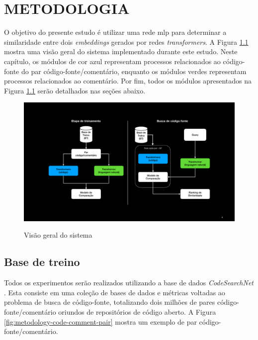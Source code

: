 \chapter{METODOLOGIA}
\label{chp:methodology}
\graphicspath{ {./imagens/metodologia} }

O objetivo do presente estudo é utilizar uma rede \gls{mlp} para determinar a similaridade entre dois \textit{embeddings} gerados por redes \textit{transformers}. A Figura \ref{fig:metodology-system_overview} mostra uma visão geral do sistema implementado durante este estudo. Neste capítulo, os módulos de cor azul representam processos relacionados ao código-fonte do par código-fonte/comentário, enquanto os módulos verdes representam processos relacionados ao comentário. Por fim, todos os módulos apresentados na Figura \ref{fig:metodology-system_overview} serão detalhados nas seções abaixo.

\begin{figure}[H]
    \centering
        \caption{Visão geral do sistema}
        \includegraphics[scale=0.3]{system-overview.pdf}
        \label{fig:metodology-system_overview}
\end{figure}

\section{Base de treino}
Todos os experimentos serão realizados utilizando a base de dados \textit{CodeSearchNet} \cite{Husain2019CodeSearchNetCE}. Esta consiste em uma coleção de bases de dados e métricas voltadas ao problema de busca de código-fonte, totalizando dois milhões de pares código-fonte/comentário oriundos de repositórios de código aberto. A Figura \ref{fig:metodology-code-comment-pair} mostra um exemplo de par código-fonte/comentário.

